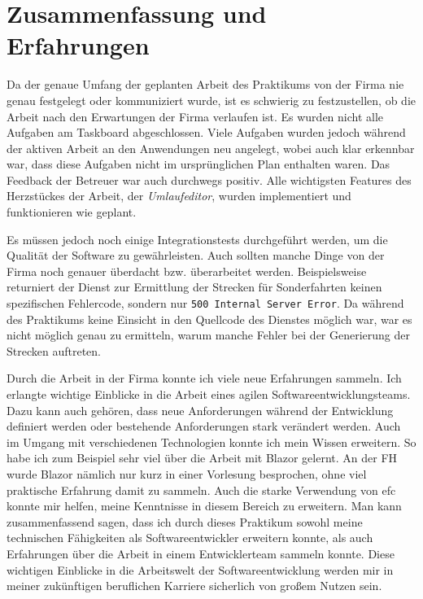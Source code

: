 \chapter{Zusammenfassung und Erfahrungen}\label{ch:ZusammenfassungundErfahrungen}
    Da der genaue Umfang der geplanten Arbeit des Praktikums von der Firma nie genau festgelegt oder kommuniziert wurde,
    ist es schwierig zu festzustellen, ob die Arbeit nach den Erwartungen der Firma verlaufen ist. Es wurden nicht alle Aufgaben am Taskboard abgeschlossen. 
    Viele Aufgaben wurden jedoch während der aktiven Arbeit an den Anwendungen neu angelegt, wobei auch klar erkennbar war, dass
    diese Aufgaben nicht im ursprünglichen Plan enthalten waren. Das Feedback der Betreuer war auch durchwegs positiv. Alle wichtigsten Features des Herzstückes 
    der Arbeit, der \emph{Umlaufeditor}, wurden implementiert und funktionieren wie geplant.

    Es müssen jedoch noch einige Integrationstests durchgeführt werden, um die Qualität der Software zu gewährleisten. Auch sollten manche Dinge von der 
    Firma noch genauer überdacht bzw. überarbeitet werden. Beispielsweise returniert der Dienst zur Ermittlung der Strecken für
    Sonderfahrten keinen spezifischen Fehlercode, sondern nur \texttt{500 Internal Server Error}. Da während des Praktikums keine Einsicht in den Quellcode
    des Dienstes möglich war, war es nicht möglich genau zu ermitteln, warum manche Fehler bei der Generierung der Strecken auftreten.

    Durch die Arbeit in der Firma konnte ich viele neue Erfahrungen sammeln. Ich erlangte wichtige Einblicke in die Arbeit eines agilen Softwareentwicklungsteams.
    Dazu kann auch gehören, dass neue Anforderungen während der Entwicklung definiert werden oder bestehende Anforderungen stark verändert werden.
    Auch im Umgang mit verschiedenen Technologien konnte ich mein Wissen erweitern. So habe ich zum Beispiel sehr viel über die Arbeit mit Blazor gelernt. An der FH 
    wurde Blazor nämlich nur kurz in einer Vorlesung besprochen, ohne viel praktische Erfahrung damit zu sammeln. Auch die starke Verwendung von \gls{efc} konnte mir 
    helfen, meine Kenntnisse in diesem Bereich zu erweitern. 
    Man kann zusammenfassend sagen, dass ich durch dieses Praktikum sowohl meine technischen Fähigkeiten als 
    Softwareentwickler erweitern konnte, als auch Erfahrungen über die Arbeit in einem Entwicklerteam sammeln konnte. Diese wichtigen Einblicke in die Arbeitswelt
    der Softwareentwicklung werden mir in meiner zukünftigen beruflichen Karriere sicherlich von großem Nutzen sein.

